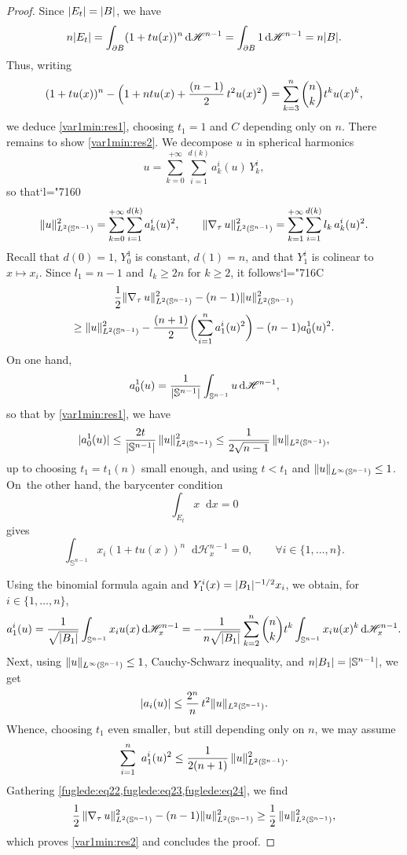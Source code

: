 \documentclass[JEP,XML,SOM,Unicode,published]{cedram}
\newcommand{\Changel}{\mathcode`l="7160}
\newcommand{\Changelback}{\mathcode`l="716C}
\numberwithin{equation}{section}
\theoremstyle{plain}
\theoremstyle{definition}
\newcommand{\dx}{\mathop{}\mathopen{}\mathrm{d}x}
\newcommand{\dH}{\mathop{}\mathopen{}\mathrm{d}\mathscr{H}}
\newcommand{\bbS}{\mathbb{S}}
\newcommand{\grad}{\nabla}
\DeclarePairedDelimiter{\abs}{\lvert}{\rvert}
\DeclarePairedDelimiter{\norm}{\lVert}{\rVert}
\begin{document}
\begin{proof}
Since $\abs{E_t}=\abs{B}$, we have
\[
n\abs{E_t}=\int_{\partial B} (1+tu(x))^n\dH^{n-1}=\int_{\partial B} 1\dH^{n-1}=n\abs{B}.
\]
Thus, writing
\[
(1+tu(x))^n-\Bigl(1+ntu(x)+\frac{(n-1)}{2}\,t^2u(x)^2\Bigr)=\sum_{k=3}^n \binom{n}{k} t^k u(x)^k,
\]
we deduce \cref{var1min:res1}, choosing \eg $t_1=1$ and $C$ depending only on $n$.
There remains to show \cref{var1min:res2}.
We decompose $u$ in spherical harmonics
\begin{equation}\label{fuglede:eq20}
u=\sum_{k=0}^{+\infty} \sum_{i=1}^{d(k)} a_k^i(u)\,Y_k^i,
\end{equation}
so that\Changel
\[
\norm{u}^2_{L^2(\bbS^{n-1})}=\sum_{k=0}^{+\infty} \sum_{i=1}^{d(k)} a_k^i(u)^2, \qquad
\norm{\grad_\tau\, u}^2_{L^2(\bbS^{n-1})}=\sum_{k=1}^{+\infty}\sum_{i=1}^{d(k)} l_k\, a_k^i(u)^2.
\]
Recall that $d(0)=1$, $Y_0^1$ is constant, $d(1)=n$, and that $Y_1^i$ is colinear to
$x\mapsto x_i$.
Since $l_1=n-1$ and~$l_k\geq 2n$ for $k\geq 2$, it follows\Changelback
\begin{multline}\label{fuglede:eq22}
\frac{1}{2}\norm{\grad_\tau\,u}_{L^2(\bbS^{n-1})}^2-(n-1)\norm{u}_{L^2(\bbS^{n-1})}^2\\
\geq \norm{u}_{L^2(\bbS^{n-1})}^2-\frac{(n+1)}{2}\biggl(\sum_{i=1}^{n} a_1^i(u)^2 \biggr)
-(n-1)a_0^1(u)^2.
\end{multline}
On one hand,
\[
a_0^1(u)=\frac{1}{\abs{\bbS^{n-1}}} \int_{\bbS^{n-1}} u\dH^{n-1},
\]
so that by \cref{var1min:res1}, we have
\begin{equation}\label{fuglede:eq23}
\abs{a_0^1(u)}\leq \frac{2t}{\abs{\bbS^{n-1}}}\, \norm{u}_{L^2(\bbS^{n-1})}^2
\leq\frac{1}{2\sqrt{n-1}}\,\norm{u}_{L^2(\bbS^{n-1})},
\end{equation}
up to choosing $t_1=t_1(n)$ small enough, and using $t<t_1$ and
$\norm{u}_{L^\infty(\bbS^{n-1})}\leq 1$.
On~the other hand, the barycenter condition
\[
\int_{E_t} x\dx=0
\]
gives
\[
\int_{\bbS^{n-1}} x_i(1+tu(x))^{n}\dH_x^{n-1}=0,\qquad\forall i\in\{1,\dotsc,n\}.
\]

Using the binomial formula again and $Y_1^i(x)=\abs{B_1}^{-1/2}x_i$, we obtain, for
$i\in\{1,\dotsc,n\}$,
\[
a_1^i(u)=\frac{1}{\sqrt{\abs{B_1}}}\int_{\bbS^{n-1}} x_i u(x)\dH_x^{n-1}
=-\frac{1}{n\sqrt{\abs{B_1}}}\sum_{k=2}^n \binom{n}{k} t^k\int_{\bbS^{n-1}} x_i u(x)^k\dH_x^{n-1}.
\]
Next, using $\norm{u}_{L^\infty(\bbS^{n-1})}\leq 1$, Cauchy-Schwarz inequality, and
$n\abs{B_1}=\abs{\bbS^{n-1}}$, we get
\[
\abs{a_i(u)}\leq \frac{2^n}{n}\, t^2\norm{u}_{L^2(\bbS^{n-1})}.
\]
Whence, choosing $t_1$ even smaller, but still depending only on $n$, we may assume
\begin{equation}\label{fuglede:eq24}
\sum_{i=1}^{n}~ a_1^i(u)^2 \leq \frac{1}{2(n+1)}\,\norm{u}_{L^2(\bbS^{n-1})}^2.
\end{equation}
Gathering \cref{fuglede:eq22,fuglede:eq23,fuglede:eq24}, we find
\[
\frac{1}{2}\,\norm{\grad_\tau\, u}_{L^2(\bbS^{n-1})}^2-(n-1)\norm{u}_{L^2(\bbS^{n-1})}^2
\geq \frac{1}{2}\,\norm{u}_{L^2(\bbS^{n-1})}^2,
\]
which proves \cref{var1min:res2} and concludes the proof.
\end{proof}
\end{document}
